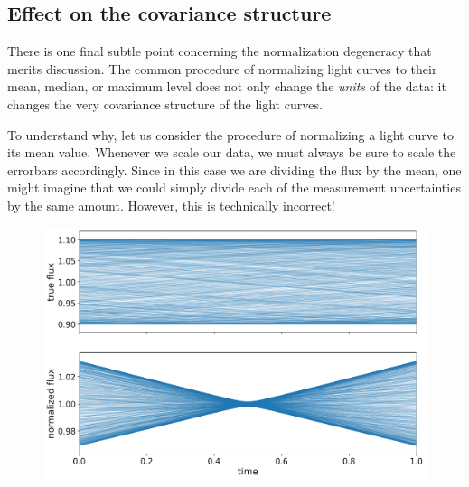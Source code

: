 \documentclass[modern]{aastex62}
\begin{document}
\subsection{Effect on the covariance structure}
\label{sec:covariance}

There is one final subtle point concerning the normalization degeneracy that merits discussion.
The common procedure of normalizing light curves to their mean, median, or
maximum level does not only change the \emph{units} of the data: it changes
the very covariance structure of the light curves.

To understand why, let us consider the procedure of normalizing a light curve
to its mean value. Whenever we scale our data, we must always be sure to
scale the errorbars accordingly. Since in this case we are dividing the
flux by the mean, one might imagine that we could simply divide each of
the measurement uncertainties by the same amount. However,
this is technically incorrect!

\begin{figure}[t!]
    \begin{centering}
        \includegraphics[width=\linewidth]{figures/nonstationarity.pdf}
    \end{centering}
\end{figure}
\end{document}
